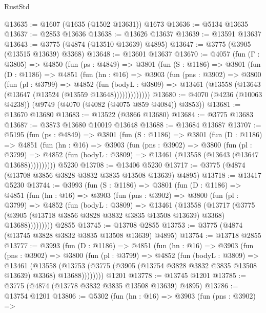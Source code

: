 \begin{lexlean}{RustStd}
\begin{coremodule}
@13635 := @1607 (@1635 (@1502 @13631)) @1673
@13636 := @5134 @13635
@13637 := @2853 @13636
@13638 := @13626 @13637
@13639 := @13591 @13637
@13643 := @3775 (@4874 (@13510 @13639) @4895)
@13647 := @3775 (@3905 (@13515 @13639) @3368)
@13648 := @13601 @13637
@13670 := @4057
    (fun (Γ : @3805) =>
    @4850
      (fun (ps : @4849) =>
      @3801
        (fun (S : @1186) =>
        @3801
          (fun (D : @1186) =>
          @4851
            (fun (hn : @16) =>
            @3903
              (fun (pns : @3902) =>
              @3800
                (fun (pl : @3799) =>
                @4852
                  (fun (bodyL : @3809) =>
                  @13461 (@13558 (@13643 (@13647 (@13524 (@13559 @13648)))))))))))))
@13680 := @4070 (@4236 (@10063 @4238)) (@9749 (@4070 (@4082 (@4075 @859 @4084)) @3853))
@13681 := @13670 @13680
@13683 := @13522 (@3866 @13680)
@13684 := @3775 @13683
@13687 := @3873 @13680 @10019 @13648
@13688 := @13684 @13687
@13707 := @5195
    (fun (ps : @4849) =>
    @3801
      (fun (S : @1186) =>
      @3801
        (fun (D : @1186) =>
        @4851
          (fun (hn : @16) =>
          @3903
            (fun (pns : @3902) =>
            @3800
              (fun (pl : @3799) =>
              @4852 (fun (bodyL : @3809) => @13461 (@13558 (@13643 (@13647 @13688))))))))))
    @5230
@13708 := @13406 @5230
@13717 := @3775 (@4874 (@13708 @3856 @3828 @3832 @3835 @13508 @13639) @4895)
@13718 := @13417 @5230
@13744 := @3993
    (fun (S : @1186) =>
    @3801
      (fun (D : @1186) =>
      @4851
        (fun (hn : @16) =>
        @3903
          (fun (pns : @3902) =>
          @3800
            (fun (pl : @3799) =>
            @4852
              (fun (bodyL : @3809) =>
              @13461
                (@13558
                  (@13717
                    (@3775
                      (@3905 (@13718 @3856 @3828 @3832 @3835 @13508 @13639) @3368)
                      @13688)))))))))
    @2855
@13745 := @13708 @2855
@13753 := @3775 (@4874 (@13745 @3828 @3832 @3835 @13508 @13639) @4895)
@13754 := @13718 @2855
@13777 := @3993
    (fun (D : @1186) =>
    @4851
      (fun (hn : @16) =>
      @3903
        (fun (pns : @3902) =>
        @3800
          (fun (pl : @3799) =>
          @4852
            (fun (bodyL : @3809) =>
            @13461
              (@13558
                (@13753 (@3775 (@3905 (@13754 @3828 @3832 @3835 @13508 @13639) @3368) @13688))))))))
    @1201
@13778 := @13745 @1201
@13785 := @3775 (@4874 (@13778 @3832 @3835 @13508 @13639) @4895)
@13786 := @13754 @1201
@13806 := @5302
    (fun (hn : @16) =>
    @3903
      (fun (pns : @3902) =>

\end{coremodule}
\end{lexlean}
